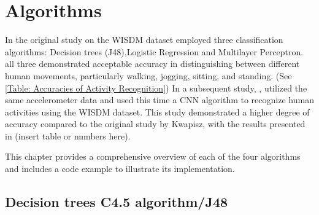 
\chapter{Algorithms}
\label{Algorithms}
In the original study on the WISDM dataset \cite{Kwapisz:2010} employed three classification algorithms: Decision trees (J48),Logistic Regression and Multilayer Perceptron. 
all three demonstrated acceptable accuracy in distinguishing between different human movements, particularly walking, jogging, sitting, and standing. (See \ref{Table: Accuracies of Activity Recognition}) 
In a subsequent study, \cite{Kant:2020}, utilized the same accelerometer data and used this time a CNN algorithm to recognize human activities using the WISDM dataset. This study demonstrated a higher degree of accuracy compared to the original study by Kwapisz, with the results presented in (insert table or numbers here).

This chapter provides a comprehensive overview of each of the four algorithms and includes a code example to illustrate its implementation.

\section{Decision trees C4.5 algorithm/J48}

%
%

